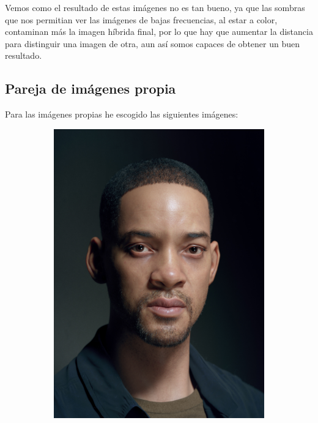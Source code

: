 \documentclass[12pt, spanish]{article}
\begin{document}
Vemos como el resultado de estas imágenes no es tan bueno, ya que las sombras que nos permitian ver las imágenes de bajas frecuencias, al estar a color, contaminan más la imagen híbrida final, por lo que hay que aumentar la distancia para distinguir una imagen de otra, aun así somos capaces de obtener un buen resultado.


\newpage


\subsection{Pareja de imágenes propia}

Para las imágenes propias he escogido las siguientes imágenes:

\begin{figure}[H]
  \centering
	\begin{subfigure}[t]{0.4\textwidth}
		\centering
      \includegraphics[scale = 1]{hibridas_color/will_smith.png}

\end{subfigure}
\end{figure}
\end{document}
